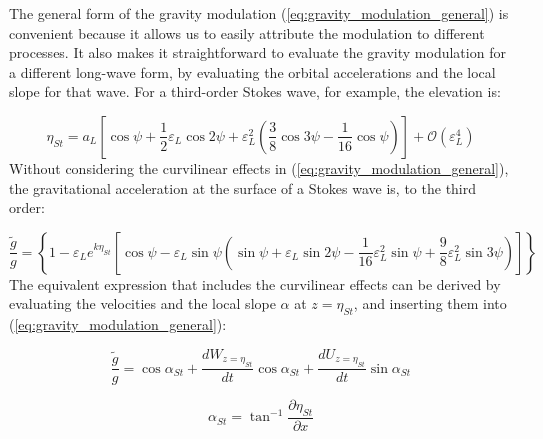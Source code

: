 \documentclass[lineno]{jfm}
\begin{document}
The general form of the gravity modulation (\ref{eq:gravity_modulation_general})
is convenient because it allows us to easily attribute the modulation to
different processes.
It also makes it straightforward to evaluate the gravity modulation for a
different long-wave form, by evaluating the orbital accelerations and the local
slope for that wave.
For a third-order Stokes wave, for example, the elevation is:

\begin{equation}
\label{eq:eta_stokes}
\eta_{St} = a_L \left[
  \cos{\psi} +
  \dfrac{1}{2} \varepsilon_L \cos{2\psi} +
  \varepsilon_L^2 \left( \dfrac{3}{8} \cos{3\psi} - \dfrac{1}{16} \cos{\psi} \right)
\right] + \mathcal{O}(\varepsilon_L^4)
\end{equation}
Without considering the curvilinear effects in (\ref{eq:gravity_modulation_general}),
the gravitational acceleration at the surface of a Stokes wave is, to the third
order:

\begin{equation}
\label{eq:gravity_modulation_stokes}
\frac{\widetilde{g}}{g} =
\left\{
  1 - \varepsilon_L e^{k \eta_{St}}
  \left[ \cos{\psi} -
    \varepsilon_L \sin{\psi} \left(
      \sin{\psi}
      + \varepsilon_L \sin{2\psi}
      - \dfrac{1}{16} \varepsilon_L^2 \sin{\psi}
      + \dfrac{9}{8} \varepsilon_L^2 \sin{3\psi}
    \right)
  \right]
\right\}
\end{equation}
The equivalent expression that includes the curvilinear effects can be derived
by evaluating the velocities and the local slope $\alpha$ at $z = \eta_{St}$,
and inserting them into (\ref{eq:gravity_modulation_general}):

\begin{equation}
\label{eq:gravity_modulation_general_stokes}
\frac{\widetilde{g}}{g}
  = \cos{\alpha_{St}}
  + \dfrac{dW_{z=\eta_{St}}}{dt} \cos{\alpha_{St}}
  + \dfrac{dU_{z=\eta_{St}}}{dt} \sin{\alpha_{St}}
\end{equation}

\begin{equation}
\label{eq:local_slope_stokes}
\alpha_{St} = \tan^{-1}{\dfrac{\partial \eta_{St}}{\partial x}}
\end{equation}
\end{document}
